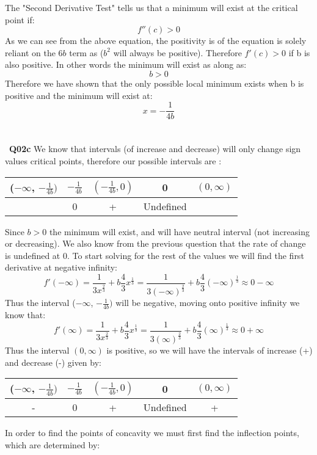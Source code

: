 \documentclass[11pt]{article}
\begin{document}
The "Second Derivative Test" tells us that a minimum will exist at the critical point if:
\[ f''(c) > 0 \]
As we can see from the above equation, the positivity is of the equation is solely reliant on the $6b$ term as ($b^2$ will always be positive). Therefore $f'(c) > 0$ if b is also positive. In other words the minimum will exist as along as:
\[ b > 0 \]
Therefore we have shown that the only possible local minimum exists when b is positive and the minimum will exist at:
\[ x= -\frac{1}{4b} \]
\\\\\
\textbf{Q02c} We know that intervals (of increase and decrease) will only change sign values critical points, therefore our possible intervals are :
\begin{center}
 \begin{tabular}{||c c c c c||} 
 \hline
 ($-\infty$, $-\frac{1}{4b})$ & $-\frac{1}{4b}$ & $(-\frac{1}{4b}, 0)$ & 0 & $(0,\infty)$  \\ [0.5ex] 
 \hline\hline
& 0 & + & Undefined &\\ 
 \hline
\end{tabular}
\end{center}
Since $b > 0$ the minimum will exist, and will have neutral interval (not increasing or decreasing). We also know from the previous question that the rate of change is undefined at 0. To start solving for the rest of the values we will find the first derivative at negative infinity:
\[ f'(-\infty) =  \frac{1}{3x^{\frac{2}{3}}} + b\frac{4}{3}x^{\frac{1}{3}} = \frac{1}{3(-\infty)^{\frac{2}{3}}} + b\frac{4}{3}(-\infty)^{\frac{1}{3}} \approx 0 -\infty  \]
Thus the interval ($-\infty$, $-\frac{1}{4b})$ will be negative, moving onto positive infinity we know that:
\[ f'(\infty) =  \frac{1}{3x^{\frac{2}{3}}} + b\frac{4}{3}x^{\frac{1}{3}} = \frac{1}{3(\infty)^{\frac{2}{3}}} + b\frac{4}{3}(\infty)^{\frac{1}{3}} \approx 0 + \infty  \]
Thus the interval $(0,\infty)$ is positive, so we will have the intervals of increase (+) and decrease (-) given by:
\begin{center}
 \begin{tabular}{||c c c c c||} 
 \hline
 ($-\infty$, $-\frac{1}{4b})$ & $-\frac{1}{4b}$ & $(-\frac{1}{4b}, 0)$ & 0 & $(0,\infty)$  \\ [0.5ex] 
 \hline\hline
- & 0 & + & Undefined & +\\ 
 \hline
\end{tabular}
\end{center}
In order to find the points of concavity we must first find the inflection points, which are determined by:
\end{document}
